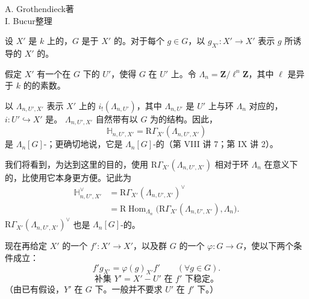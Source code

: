 \begin{center}A. Grothendieck\quad 著\\I. Bucur\quad 整理\end{center}

设 $X'$ 是 $k$ 上的，$G$ 是于 $X'$ 的。对于每个 $g\in G$，以 $g_{X'}:X'\longrightarrow X'$ 表示 $g$ 所诱导的 $X'$ 的。

假定 $X'$ 有一个在 $G$ 下的 $U'$，使得 $G$ 在 $U'$ 上。令 $\Lambda_n=\mathbf Z/\ell^n\mathbf Z$，其中 $\ell$ 是异于 $k$ 的的素数。

以 $\Lambda_{n,U',X'}$ 表示 $X'$ 上的 $i_!(\Lambda_{n,U'})$，其中 $\Lambda_{n,U'}$ 是 $U'$ 上与环 $\Lambda_n$ 对应的，$i:U'\hookrightarrow X'$ 是。 $\Lambda_{n,U',X'}$ 自然带有以 $G$ 为的结构。因此，
\[
\mathbb H_{n,U',X'}=\mathrm R\Gamma_{X'}(\Lambda_{n,U',X'})
\]
是 $\Lambda_n[G]$-；更确切地说，它是 $\Lambda_n[G]$-的（第 VIII 讲 7；第 IX 讲 2）。

我们将看到，为达到这里的目的，使用 $\mathrm R\Gamma_{X'}(\Lambda_{n,U',X'})$ 相对于环 $\Lambda_n$ 在意义下的，比使用它本身更方便。记此为
\[
\begin{aligned}
\mathbb H_{n,U',X'}^\vee
 &=\mathrm R\Gamma_{X'}(\Lambda_{n,U',X'})^\vee\\
 &=\mathrm R\operatorname{Hom}_{\Lambda_n}
   \bigl(\mathrm R\Gamma_{X'}(\Lambda_{n,U',X'}),\Lambda_n\bigr).
\end{aligned}
\]
 $\mathrm R\Gamma_{X'}(\Lambda_{n,U',X'})^\vee$ 也是 $\Lambda_n[G]$-的。

现在再给定 $X'$ 的一个 $f':X'\longrightarrow X'$，以及群 $G$ 的一个 $\varphi:G\longrightarrow G$，使以下两个条件成立：
\[
f'g_{X'}=\varphi(g)_{X'}f'\qquad(\forall g\in G).
\tag{1.1}
\]
\[
\text{补集 }Y'=X'-U'\text{ 在 }f'\text{ 下稳定。}
\tag{1.2}
\]
（由已有假设，$Y'$ 在 $G$ 下。一般并不要求 $U'$ 在 $f'$ 下。）

